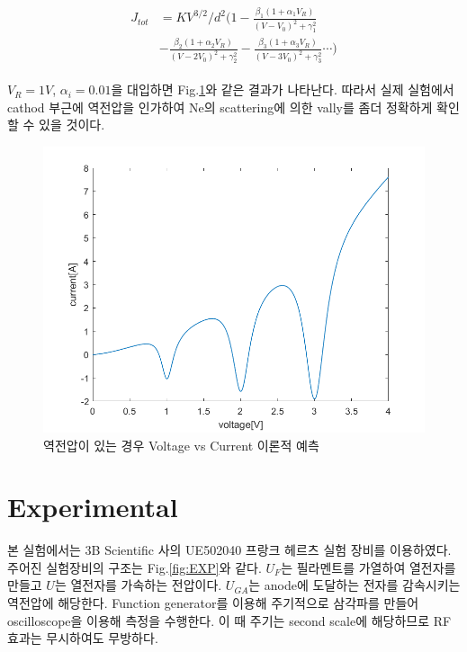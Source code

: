 \documentclass[%
 reprint,
 amsmath,amssymb,
 aps,
]{revtex4-2}
\begin{document}
\begin{align}
	\begin{aligned}
	J_{tot} &= KV^{3/2}/d^{2}\Bigg(1-\frac{\beta_{1}(1+\alpha_{1}V_{R})}{(V-V_{0})^{2}+\gamma_{1}^{2}} \\
	&-\frac{\beta_{2}(1+\alpha_{2}V_{R})}{(V-2V_{0})^{2}+\gamma_{2}^{2}} -\frac{\beta_{3}(1+\alpha_{3}V_{R})}{(V-3V_{0})^{2}+\gamma_{3}^{2}} \cdots \Bigg)
	\end{aligned}
\end{align}

$V_{R} = 1V$, $\alpha_{i} = 0.01$을 대입하면 Fig.\ref{fig:SIM2}와 같은 결과가 나타난다. 따라서 실제 실험에서 cathod 부근에 역전압을 인가하여 Ne의 scattering에 의한 vally를 좀더 정확하게 확인할 수 있을 것이다.

\begin{figure}[htbp]
	\includegraphics[width = 0.85\linewidth]{SIM2.png}%
	\caption{\label{fig:SIM2}역전압이 있는 경우 Voltage vs Current 이론적 예측}
\end{figure}

\section{Experimental}
본 실험에서는 3B Scientific 사의 UE502040 프랑크 헤르츠 실험 장비를 이용하였다. 주어진 실험장비의 구조는 Fig.\ref{fig:EXP}와 같다. $U_{F}$는 필라멘트를 가열하여 열전자를 만들고 $U$는 열전자를 가속하는 전압이다. $U_{GA}$는 anode에 도달하는 전자를 감속시키는 역전압에 해당한다. Function generator를 이용해 주기적으로 삼각파를 만들어 oscilloscope을 이용해 측정을 수행한다. 이 때 주기는 second scale에 해당하므로 RF효과는 무시하여도 무방하다.
\end{document}
